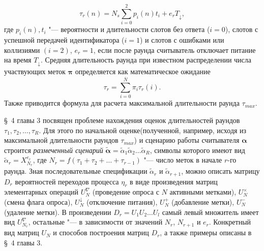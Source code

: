 \begin{equation}\label{eq:round_duration_of_n}
	\tau_r(n) = N_s \sum\limits_{i=0}^{2}p_i(n)t_i + e_r T_\downarrow,
\end{equation}
где $p_i(n), t_i$ "--- вероятности и длительности слотов без ответа ($i = 0$), слотов с успешной передачей идентификатора ($i = 1$) и слотов с ошибками или коллизиями $(i = 2)$, $e_r = 1$, если после раунда считыватель отключает питание на время $T_{\downarrow}$. Средняя длительность раунда при известном распределении числа участвующих меток $\bm{\pi}$ определяется как математическое ожидание 
\begin{equation}\label{eq:avg_round_duration}
  \tau_r = \sum_{i = 0}^{\overline{N}} \pi_i \tau_r(i).
\end{equation}
Также приводится формула для расчета максимальной длительности раунда $\tau_{max}$.

\S~4 главы 3 посвящен проблеме нахождения оценок длительностей раундов $\tau_1, \tau_2, \dots, \tau_R$. Для этого по начальной оценке(полученной, например, исходя из максимальной длительности раундов $\tau_{max}$) и сценарию работы считывателя $\bm{\alpha}$ строится \textit{размеченный сценарий} $\widetilde{\bm{\alpha}} = \widetilde{\alpha}_1 \widetilde{\alpha}_2 \dots \widetilde{\alpha}_R$, символы которого имеют вид $\widetilde{\alpha}_r = X_{N_r}^{e_r}$, где $N_r = f(\tau_1 + \tau_2 + \dots + \tau_{r-1})$ "--- число меток в начале $r$-го раунда. Зная последовательные спецификации $\widetilde{\alpha}_{r}$ и $\widetilde{\alpha}_{r+1}$, можно описать матрицу $D_r$ вероятностей переходов процесса $\eta_r$ в виде произведения матриц элементарных операций $U_N^\nabla$ (проведение опроса с $N$ активными метками), $U_N^\times$ (смена флага опроса), $U_N^\downarrow$ (отключение питания), $U_N^+$ (добавление метки), $U_N^-$ (удаление метки). В произведении $D_r = U_1 U_2 \dots U_l$ самый левый множитель имеет вид $U_{N_r}^\nabla$, остальные "--- в зависимости от значений $N_r$, $N_{r+1}$ и $e_r$. Конкретный вид матриц $U_N$ и способов построения матриц $D_r$, а также примеры описаны в \S~4 главы 3.

